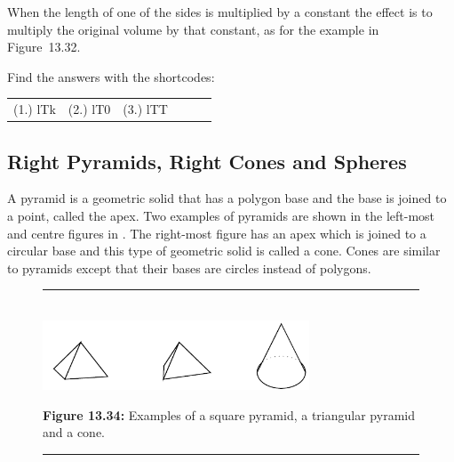         \label{m39357*id64533}When the length of one of the sides is multiplied by a constant the effect is to multiply the original volume by that constant, as for the example in Figure~13.32.\par 
      
    

  \label{m39357*cid323}
\par {} Find the answers with the shortcodes:
 \par \begin{tabular}[h]{cccccc}
 (1.) lTk  &  (2.) lT0  &  (3.) lTT  & \end{tabular}



            \subsection{ Right Pyramids, Right Cones and Spheres}
            \nopagebreak
            
      
      \label{m39357*id62623}A pyramid is a geometric solid that has a polygon base and the base is joined to a point, called the apex. Two examples of pyramids are shown in the left-most and centre figures in . The right-most figure has an apex which is joined to a circular base and this type of geometric solid is called a cone. Cones are similar to pyramids except that their bases are circles instead of polygons.\par 
      
    \setcounter{subfigure}{0}


	\begin{figure}[H] %
    \begin{center}
    \rule[.1in]{\figurerulewidth}{.005in} \\
        \label{m39357*uid676!!!underscore!!!media}\label{m39357*uid676!!!underscore!!!printimage}\includegraphics[width=300px]{col11306.imgs/m39357_MG11C16_001.png} %
        
      \vspace{2pt}
    \vspace{\rubberspace}\par \begin{cnxcaption}
	  \small \textbf{Figure 13.34: }Examples of a square pyramid, a triangular pyramid and a cone.
	\end{cnxcaption}
      
    \vspace{.1in}
    \rule[.1in]{\figurerulewidth}{.005in} \\
        
    \end{center}

 \end{figure}   

